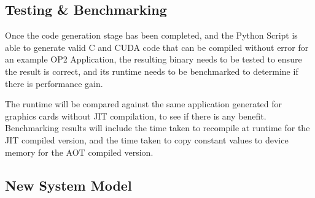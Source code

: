 \subsection{Testing \& Benchmarking}
Once the code generation stage has been completed, and the Python Script is able to generate valid C and CUDA code that can be compiled without error for an example OP2 Application, the resulting binary needs to be tested to ensure the result is correct, and its runtime needs to be benchmarked to determine if there is performance gain.
\par
The runtime will be compared against the same application generated for graphics cards without JIT compilation, to see if there is any benefit. Benchmarking results will include the time taken to recompile at runtime for the JIT compiled version, and the time taken to copy constant values to device memory for the AOT compiled version.


\clearpage
\subsection{New System Model}


